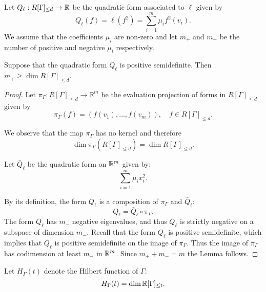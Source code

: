 \noindent Let $Q_{\ell}: R[\Gamma]_{\leq d} \rightarrow \mathbb{R}$ be the quadratic form associated to $\ell$ given by 
$$Q_{\ell}(f)=\ell(f^2)=\sum_{i=1}^m \mu_if^2(v_i).$$ 
We assume that the coefficients $\mu_i$ are non-zero and let $m_+$ and $m_-$ be the number of positive and negative $\mu_i$ respectively.  


\begin{lemma}\label{Lemma:Signs} Suppose that the quadratic form $Q_{\ell}$ is positive semidefinite. Then $m_+\geq \dim R[\Gamma]_{\leq d}$.
\end{lemma}
\begin{proof}
Let $\pi_{\Gamma}: R[\Gamma]_{\leq d} \rightarrow \mathbb{R}^{m}$ be the evaluation projection of forms in $R[\Gamma]_{\leq d}$ given by
$$\pi_{\Gamma}(f)=\left(f(v_1),\ldots,f(v_m)\right), \quad f \in R[\Gamma]_{\leq d}.$$

\noindent We observe that the map $\pi_{\Gamma}$ has no kernel and therefore $$\dim \pi_{\Gamma}(R[\Gamma]_{\leq d})=\dim R[\Gamma]_{\leq d}.$$


\noindent Let $\bar{Q}_{\ell}$ be the quadratic form on $\mathbb{R}^{m}$ given by: $$\sum_{i=1}^m \mu_ix_i^2.$$

\noindent By its definition, the form $Q_{\ell}$ is a composition of $\pi_{\Gamma}$ and $\bar{Q}_{\ell}$:
$$Q_{\ell}=\bar{Q}_{\ell}\circ \pi_{\Gamma}.$$
The form $\bar{Q}_{\ell}$ has $m_-$ negative eigenvalues, and thus $\bar{Q}_{\ell}$ is strictly negative on a subspace of dimension $m_-$. Recall that the form $Q_{\ell}$ is positive semidefinite, which implies that $\bar{Q}_{\ell}$ is positive semidefinite on the image of $\pi_{\Gamma}$. Thus the image of $\pi_{\Gamma}$ has codimension at least $m_-$ in $\mathbb{R}^m$. Since $m_++m_-=m$ the Lemma follows.
\end{proof}



Let $H_\Gamma(t)$ denote the Hilbert function of $\Gamma$: $$H_\Gamma(t)=\dim \mathbb{R}[\Gamma]_{\leq t}.$$

